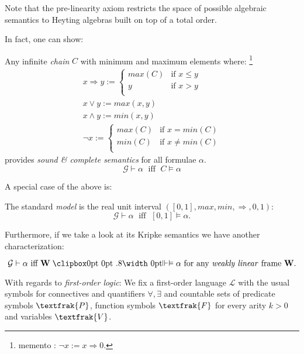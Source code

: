 		 Note that the pre-linearity axiom restricts the space of possible algebraic semantics to Heyting algebras built on top of a total order.\newline
		 
		 In fact, one can show:
		 \begin{prop}
		 	Any infinite \emph{chain} $C$ with minimum and maximum elements where: \footnote{memento : $\neg x := x \Rightarrow 0 $.} 
		 		\begin{gather*}
		 		x \Rightarrow y :=\begin{cases}
		 			max (C) & \text{if }x \leq y\\
		 			y &	\text{if }x > y \\
		 		\end{cases}     \\
		 		x \lor y := max(x,y) \\ x \land y := min(x,y) \\
		 		\neg x:=\begin{cases}
		 			max (C) &	\text{if }x = min (C) \\
		 			min (C) & \text{if }x \neq min (C)\\
		 		\end{cases}     
		 	\end{gather*}
		 	provides \emph{sound \& complete semantics} for all formulae $\alpha$. 
		 	 \[ \mathcal{G} \vdash \alpha \; \text{ iff } \; C \models \alpha \]
		 \end{prop} 
		A special case of the above is:
		\begin{definition}\label{standard}
				The standard \emph{model} is the real unit interval $([0,1],max,min,\Rightarrow,0,1)$:
			\[ \mathcal{G} \vdash \alpha \; \text{ iff } \; [0,1] \models \alpha. \]
		\end{definition}
		
		Furthermore, if we take a look at its Kripke semantics we have another characterization:
		\begin{prop}
			\begin{equation*}
				\mathcal{G} \vdash \alpha \text{ iff }\textbf{W} \VDashA \alpha\text{ for any \emph{weakly linear} frame \textbf{W}}.
			\end{equation*}
		\end{prop}
		\newpage
		 With regards to \emph{first-order logic}:
		 \newline\newline
		 We fix a first-order language $\mathcal{L}$ with the usual symbols for connectives and quantifiers $\forall,\exists$ and countable sets of predicate symbols $\textfrak{P}$, function symbols $\textfrak{F}$ for every arity $k>0$ and variables $\textfrak{V}$.\newline
		

